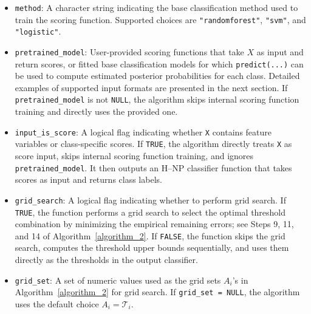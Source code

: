 \begin{itemize}

\item \texttt{method}: A character string indicating the base classification method used to train the scoring function. Supported choices are \texttt{"randomforest"}, \texttt{"svm"}, and \texttt{"logistic"}.

\item \texttt{pretrained\_model}: User-provided scoring functions that take \(X\) as input and return scores, or fitted base classification models for which \texttt{predict(...)} can be used to compute estimated posterior probabilities for each class. Detailed examples of supported input formats are presented in the next section. If \texttt{pretrained\_model} is not \texttt{NULL}, the algorithm skips internal scoring function training and directly uses the provided one.
  


\item \texttt{input\_is\_score}: A logical flag indicating whether \texttt{X} contains feature variables or class-specific scores. If \texttt{TRUE}, the algorithm directly treats \texttt{X} as score input, skips internal scoring function training, and ignores \texttt{pretrained\_model}. It then outputs an H--NP classifier function that takes scores as input and returns class labels.






\item \texttt{grid\_search}: A logical flag indicating whether to perform grid search. If \texttt{TRUE}, the function performs a grid search to select the optimal threshold combination by minimizing the empirical remaining errors; see Steps 9, 11, and 14 of Algorithm~\ref{algorithm_2}. If \texttt{FALSE}, the function skips the grid search, computes the threshold upper bounds sequentially, and uses them directly as the thresholds in the output classifier.
  
\item \texttt{grid\_set}: A set of numeric values used as the grid sets \(A_i\)'s in Algorithm~\ref{algorithm_2} for grid search. If \texttt{grid\_set = NULL}, the algorithm uses the default choice \(A_i = \mathcal{T}_i\).
  








\end{itemize}
